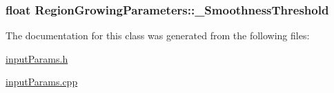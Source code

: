 \hypertarget{classRegionGrowingParameters_ad994980f1816d8452ec2beecde4a33f4}{
\subsubsection[{\-\_\-\-Smoothness\-Threshold}]{\setlength{\rightskip}{0pt plus 5cm}float Region\-Growing\-Parameters\-::\-\_\-\-Smoothness\-Threshold\hspace{0.3cm}{\ttfamily [private]}}}\label{classRegionGrowingParameters_ad994980f1816d8452ec2beecde4a33f4}


The documentation for this class was generated from the following files\-:\begin{DoxyCompactItemize}
\item 
\hyperlink{inputParams_8h}{input\-Params.\-h}\item 
\hyperlink{inputParams_8cpp}{input\-Params.\-cpp}\end{DoxyCompactItemize}
